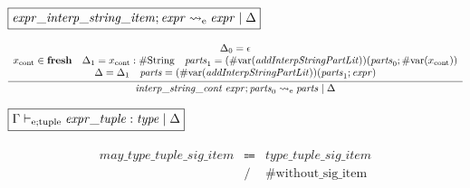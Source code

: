 $\fbox{$\mathit{expr\_interp\_string\_item}; \mathit{expr} \rightsquigarrow_\mathrm{e} \mathit{expr} \mid \Delta$}$

\begin{gather*}
    \infer{\mathit{interp\_string\_cont}\; \mathit{expr}; \mathit{parts}_0 \rightsquigarrow_\mathrm{e} \mathit{parts} \mid \Delta}{
        \begin{array}{c}
            \Delta_0 = \epsilon
            \\
            x_\mathrm{cont} \in \mathbf{fresh}
            \hspace{1em}
            \Delta_1 = x_\mathrm{cont}: \mathrm{\#String}
            \hspace{1em}
            \mathit{parts}_1 = (\mathrm{\#var}(\mathit{addInterpStringPartLit}))(\mathit{parts}_0; \mathrm{\#var}(x_\mathrm{cont}))
            \\
            \Delta = \Delta_1
            \hspace{1em}
            \mathit{parts} = (\mathrm{\#var}(\mathit{addInterpStringPartLit}))(\mathit{parts}_1; \mathit{expr})
        \end{array}
    }
\end{gather*}

$\fbox{$\Gamma \vdash_{\mathrm{e}; \mathrm{tuple}} \mathit{expr\_tuple}: \mathit{type} \mid \Delta$}$

\begin{align*}
    \begin{array}{rcll}
        \mathit{may\_type\_tuple\_sig\_item}
        &\Coloneq &\mathit{type\_tuple\_sig\_item} \\
        &\mathrel{/} &\mathrm{\#without\_sig\_item}
    \end{array}
\end{align*}

